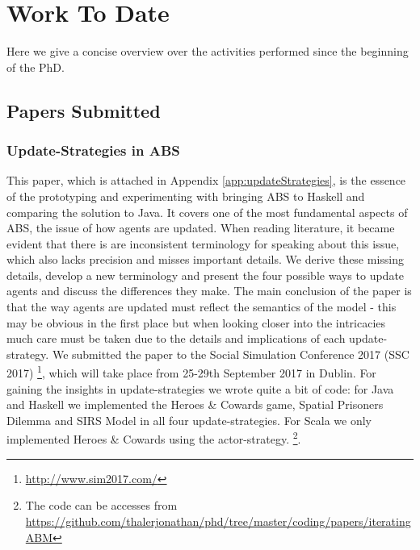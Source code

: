 \chapter{Work To Date}
\label{chap:work}


Here we give a concise overview over the activities performed since the beginning of the PhD. 

\section{Papers Submitted}
\subsection{Update-Strategies in ABS}
This paper, which is attached in Appendix \ref{app:updateStrategies}, is the essence of the prototyping and experimenting with bringing ABS to Haskell and comparing the solution to Java. It covers one of the most fundamental aspects of ABS, the issue of how agents are updated. When reading literature, it became evident that there is are inconsistent terminology for speaking about this issue, which also lacks precision and misses important details. We derive these missing details, develop a new terminology and present the four possible ways to update agents and discuss the differences they make. The main conclusion of the paper is that the way agents are updated must reflect the semantics of the model - this may be obvious in the first place but when looking closer into the intricacies  much care must be taken due to the details and implications of each update-strategy.
We submitted the paper to the Social Simulation Conference 2017 (SSC 2017) \footnote{\url{http://www.sim2017.com/}}, which will take place from 25-29th September 2017 in Dublin.
For gaining the insights in update-strategies we wrote quite a bit of code: for Java and Haskell we implemented the Heroes \& Cowards game, Spatial Prisoners Dilemma and SIRS Model in all four update-strategies. For Scala we only implemented Heroes \& Cowards using the actor-strategy.
\footnote{The code can be accesses from \url{https://github.com/thalerjonathan/phd/tree/master/coding/papers/iteratingABM}}. 

